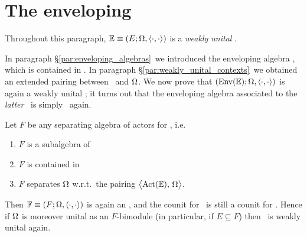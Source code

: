 \section{The enveloping \context}
\label{par:enveloping_context}

Throughout this paragraph, $\mathbb{E} \equiv (E; \Omega, \langle\cdot, \cdot\rangle)$ is a {\em weakly unital\/} \context.


\begin{abs_chp}
In paragraph \S \ref{par:enveloping_algebras}\ we introduced the enveloping algebra \EnvE,
which is contained in \ActE\@. In paragraph \S \ref{par:weakly_unital_contexts}\ we
obtained an extended pairing between \ActE\ and $\Omega$.
We now prove that $(\mbox{\rm Env}(\mathbb{E}); \Omega,\langle\cdot, \cdot\rangle)$ is again a weakly unital \context;
it turns out that the enveloping algebra associated to the {\em latter\/}
\context\ is simply \EnvE\ again.
\end{abs_chp}



\begin{lemma_sec} \label{lem:context_over_separ_alg}
  Let\/ $F$ be any separating algebra of actors for\/ \EE, i.e.\
  \begin{enumerate}
    \item $F$ is a subalgebra of\/ \PreE
    \item $F$ is contained in\/ \ActE\
    \item $F$ separates\/ $\Omega$ w.r.t.\ the pairing $\pairM{\ActE}{\Om}$.
  \end{enumerate}
  Then\/ $\mathbb{F} \equiv (F; \Omega, \langle\cdot, \cdot\rangle)$ is again an \context,
  and the counit for\/ \EE\ is still a counit for\/ \FF\@.
  Hence if\/ $\Omega$ is moreover unital as an $F$-bimodule
  (in particular, if $E \subseteq F$)
  then \FF\ is weakly unital again.
\end{lemma_sec}

